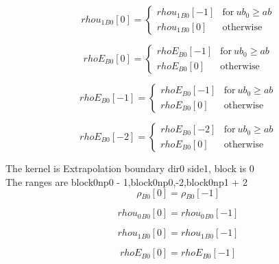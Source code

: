 \documentclass{article}
\begin{document}
\begin{dmath}{rhou_{1}{_{B0}}}[{0}] = \begin{cases} {rhou_{1}{_{B0}}}[{-1}] & \text{for}\: ub_{0} \geq ab \\{rhou_{1}{_{B0}}}[{0}] & \text{otherwise} \end{cases}\end{dmath}

\begin{dmath}{rhoE{_{B0}}}[{0}] = \begin{cases} {rhoE{_{B0}}}[{-1}] & \text{for}\: ub_{0} \geq ab \\{rhoE{_{B0}}}[{0}] & \text{otherwise} \end{cases}\end{dmath}

\begin{dmath}{rhoE{_{B0}}}[{-1}] = \begin{cases} {rhoE{_{B0}}}[{-1}] & \text{for}\: ub_{0} \geq ab \\{rhoE{_{B0}}}[{0}] & \text{otherwise} \end{cases}\end{dmath}

\begin{dmath}{rhoE{_{B0}}}[{-2}] = \begin{cases} {rhoE{_{B0}}}[{-2}] & \text{for}\: ub_{0} \geq ab \\{rhoE{_{B0}}}[{0}] & \text{otherwise} \end{cases}\end{dmath}

\noindent The kernel is Extrapolation boundary dir0 side1, block is 0\\\noindent The ranges are block0np0 - 1,block0np0,-2,block0np1 + 2\\\begin{dmath}{\rho{_{B0}}}[{0}] = {\rho{_{B0}}}[{-1}]\end{dmath}

\begin{dmath}{rhou_{0}{_{B0}}}[{0}] = {rhou_{0}{_{B0}}}[{-1}]\end{dmath}

\begin{dmath}{rhou_{1}{_{B0}}}[{0}] = {rhou_{1}{_{B0}}}[{-1}]\end{dmath}

\begin{dmath}{rhoE{_{B0}}}[{0}] = {rhoE{_{B0}}}[{-1}]\end{dmath}
\end{document}
